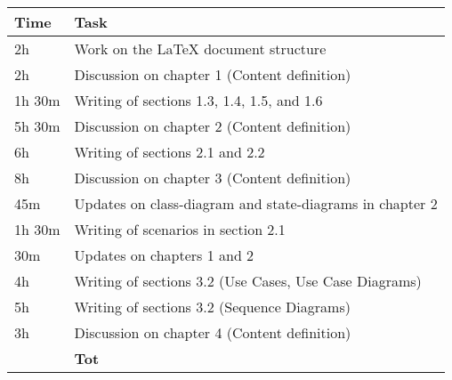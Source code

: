 \begin{center}
    {\renewcommand{\arraystretch}{2}%
    \begin{tabular}{L{2cm}L{12cm}}
        \hline
        \textbf{Time} & \textbf{Task} \\
        \hline
        2h & Work on the LaTeX document structure \\
        \hline
        2h & Discussion on chapter 1 (Content definition) \\
        \hline
        1h 30m& Writing of sections 1.3, 1.4, 1.5, and 1.6 \\
        \hline
        5h 30m & Discussion on chapter 2 (Content definition) \\
        \hline
        6h & Writing of sections 2.1 and 2.2 \\
        \hline
        8h & Discussion on chapter 3 (Content definition) \\
        \hline
        45m & Updates on class-diagram and state-diagrams in chapter 2 \\
        \hline
        1h 30m & Writing of scenarios in section 2.1 \\
        \hline
        30m & Updates on chapters 1 and 2 \\
        \hline
        4h & Writing of sections 3.2 (Use Cases, Use Case Diagrams) \\
        \hline
        5h & Writing of sections 3.2 (Sequence Diagrams) \\
        \hline
        3h & Discussion on chapter 4 (Content definition) \\
        \hline
        \textbf{} & \textbf{Tot} \\
    \end{tabular}}
\end{center}
